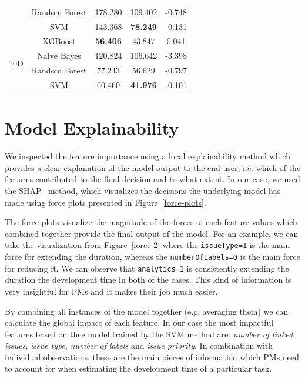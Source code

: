 \documentclass[conference,compsoc]{IEEEtran}
\begin{document}
\begin{table}[!t]
\begin{tabular}{c|c|c|c|c}
		&Random Forest& 178.280 & 109.402 & -0.748 \\
		& SVM & 143.368 & \textbf{78.249} & -0.131 \\
		\hline
		\multirow{4}{*}{10D}
		&XGBoost& \textbf{56.406} & 43.847 & 0.041 \\
		&Naive Bayes& 120.824 & 106.642 & -3.398 \\
		&Random Forest& 77.243 & 56.629 & -0.797 \\
		& SVM & 60.460 & \textbf{41.976} & -0.101 \\
	\end{tabular}
\end{table}

\section{Model Explainability}
We inspected the feature importance using a local explainability method which provides a clear explanation of the model output to the end user, i.e. which of the features contributed to the final decision and to what extent. In our case, we used the SHAP~\cite{lundberg2020local2global} method, which visualizes the decisions the underlying model has made using force plots presented in Figure~\ref{force-plots}.

The force plots visualize the magnitude of the forces of each feature values which combined together provide the final output of the model. For an example, we can take the visualization from Figure~\ref{force-2} where the \texttt{issueType=1} is the main force for extending the duration, whereas the \texttt{numberOfLabels=0} is the main force for reducing it. We can observe that \texttt{analytics=1} is consistently extending the duration the development time in both of the cases. This kind of information is very insightful for PMs and it makes their job much easier.

By combining all instances of the model together (e.g. averaging them) we can calculate the global impact of each feature. In our case the most impactful features based on thee model trained by the SVM method are: \textit{number of linked issues}, \textit{issue type}, \textit{number of labels} and \textit{issue priority}. In combination with individual observations, these are the main pieces of information which PMs need to account for when estimating the development time of a particular task.
\end{document}
